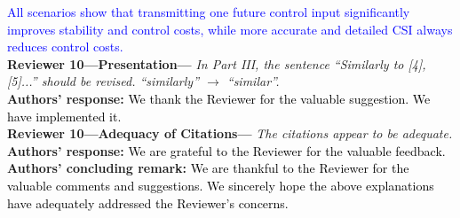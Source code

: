 \textcolor{blue}{All scenarios show that transmitting one future control input significantly improves stability and control costs, while more accurate and detailed CSI always reduces control costs.}\\[4mm]
\textbf{Reviewer 10---Presentation---}\textit{%
In Part III, the sentence ``Similarly to [4], [5]...'' should be revised. ``similarly'' $\to$ ``similar''.}\\[2mm]
\textbf{Authors' response:} \textcolor{black}{We thank the Reviewer for the valuable suggestion. We have implemented it.}\\[4mm]
\textbf{Reviewer 10---Adequacy of Citations---}\textit{%
The citations appear to be adequate.}\\[2mm]
\textbf{Authors' response:} \textcolor{black}{We are grateful to the Reviewer for the valuable feedback.}\\[4mm]
\textbf{Authors' concluding remark:} \textcolor{black}{We are thankful to the Reviewer for the valuable comments and suggestions. We sincerely hope the above explanations have adequately addressed the Reviewer's concerns.}
